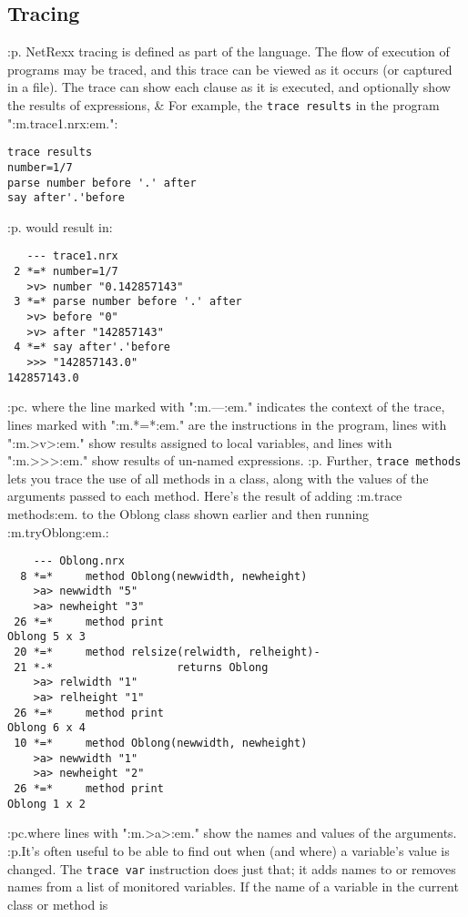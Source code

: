 \subsection{Tracing}\label{refotrace}
:p.
NetRexx tracing is defined as part of the language.
The flow of execution of programs may be traced, and this trace can be
viewed as it occurs (or captured in a file).  The trace can show each
clause as it is executed, and optionally show the results of
expressions, \&  For example, the \texttt{trace results} in the
program ":m.trace1.nrx:em.":
\begin{verbatim}
trace results
number=1/7
parse number before '.' after
say after'.'before
\end{verbatim}
:p.
would result in:
\begin{verbatim}
   --- trace1.nrx
 2 *=* number=1/7
   >v> number "0.142857143"
 3 *=* parse number before '.' after
   >v> before "0"
   >v> after "142857143"
 4 *=* say after'.'before
   >>> "142857143.0"
142857143.0
\end{verbatim}
:pc.
where the line marked with ":m.---:em." indicates the context
of the trace, lines marked with ":m.*=*:em." are the
instructions in the program, lines with ":m.>v>:em."
show results assigned to local variables, and lines with
":m.>>>:em." show results of un-named expressions.
:p.
Further, \texttt{trace methods} lets you trace the use of all methods in
a class, along with the values of the arguments passed to each method.
Here's the result of adding :m.trace methods:em. to the Oblong class
shown earlier and then running :m.tryOblong:em.:
\begin{verbatim}
    --- Oblong.nrx
  8 *=*     method Oblong(newwidth, newheight)
    >a> newwidth "5"
    >a> newheight "3"
 26 *=*     method print
Oblong 5 x 3
 20 *=*     method relsize(relwidth, relheight)-
 21 *-*                   returns Oblong
    >a> relwidth "1"
    >a> relheight "1"
 26 *=*     method print
Oblong 6 x 4
 10 *=*     method Oblong(newwidth, newheight)
    >a> newwidth "1"
    >a> newheight "2"
 26 *=*     method print
Oblong 1 x 2
\end{verbatim}
:pc.where
lines with ":m.>a>:em." show the names and values of the
arguments.
:p.It's often useful to be able to find out when (and where) a
variable's value is changed.  The \texttt{trace var} instruction does
just that; it adds names to or removes names from a list of monitored
variables. If the name of a variable in the current class or method is
